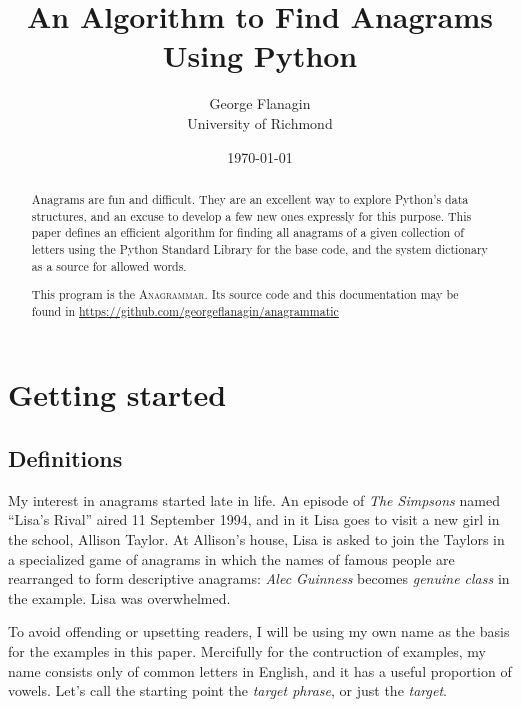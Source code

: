 \documentclass[letterpaper, 11pt]{article}
\title{An Algorithm to Find Anagrams Using Python}
\author{George Flanagin\\University of Richmond\\\lit{gflanagin@richmond.edu}}
\date{\today}
\providecommand{\anagrammar}{A\textsc{nagrammar}\xspace}
\begin{document}
\maketitle
\begin{abstract}
Anagrams are fun and difficult. They are an excellent way to explore
Python's data structures, and an excuse to develop a few new ones
expressly for this purpose. This paper defines an efficient algorithm
for finding all anagrams of a given collection of letters using the
Python Standard Library for the base code, and the system dictionary
as a source for allowed words. 

This program is the \anagrammar. Its source code and this documentation
may be found in \href{https://github.com/georgeflanagin/anagrammatic}
{https://github.com/georgeflanagin/anagrammatic}

\end{abstract}

\tableofcontents
\listoffigures

\newpage
\pagewiselinenumbers
\section{Getting started}

\subsection{Definitions}
My interest in anagrams started late in life. An episode of
\emph{The Simpsons} named ``Lisa's Rival'' aired 11 September 1994,
and in it Lisa goes to visit a new girl in the school, Allison
Taylor. At Allison's house, Lisa is asked to join the Taylors in a
specialized game of anagrams in which the names of famous people
are rearranged to form descriptive anagrams: \emph{Alec Guinness}
becomes \emph{genuine class} in the example.  Lisa was overwhelmed.

To avoid offending or upsetting readers, I will be using my own
name as the basis for the examples in this paper. Mercifully for
the contruction of examples, my name consists only of common letters
in English, and it has a useful proportion of vowels. Let's call
the starting point the \emph{target phrase}, or just the \emph{target}.
\end{document}
